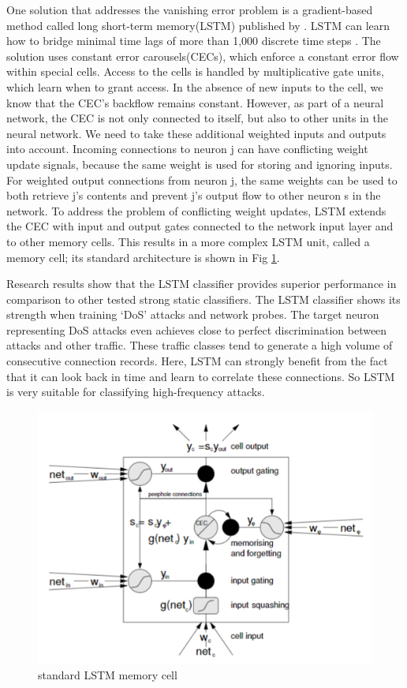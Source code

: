 \documentclass[conference]{IEEEtran}
\begin{document}
One solution that addresses the vanishing error problem is a gradient-based method called long short-term memory(LSTM) published by \cite{hochreiter1997long}\cite{gers1999learning}\cite{gers2002learning}. LSTM can learn how to bridge minimal time lags of more than 1,000 discrete time steps \cite{hochreiter1997long}.  The solution uses constant error carousels(CECs), which enforce a constant error flow within special cells.  Access to the cells is handled by multiplicative gate units, which learn when to grant access. In the absence of new inputs to the cell, we know that the CEC’s backflow remains constant.  However, as part of a neural  network, the CEC is not only connected to itself, but also to other units in the neural network.  We need to take these additional weighted inputs and outputs into account.  Incoming connections to neuron j can have conflicting weight update signals, because the same weight is used for storing and ignoring inputs.  For weighted output connections from neuron j, the same weights can be used to both retrieve j’s contents and prevent j’s output flow to other neuron s in the network. To address the problem of conflicting weight updates, LSTM extends the CEC with input and output gates connected to the network input layer and to other memory cells.  This results in a more complex LSTM unit, called a memory cell; its standard architecture is shown in Fig \ref{fig:lstm}.

Research results \cite{staudemeyer2015applying}  show that the LSTM classifier provides superior performance in comparison to other tested strong static classifiers. The LSTM classifier shows its strength when training ‘DoS’ attacks and network probes.  The target neuron representing DoS attacks even achieves close to perfect discrimination between attacks and other traffic. These traffic classes tend to generate a high volume of consecutive connection records. Here, LSTM can strongly benefit from the fact that it can look back in time and learn to correlate these connections. So LSTM is very suitable for classifying high-frequency attacks.

\begin{figure}[ht]
\centering
\includegraphics[scale=0.8]{pictures/lstm.png}
\caption{standard LSTM memory cell}
\label{fig:lstm}
\end{figure}
\end{document}
